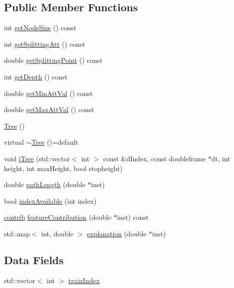 \subsection*{Public Member Functions}
\begin{DoxyCompactItemize}
\item 
int \hyperlink{classTree_a0ab54e1652274e304c25473759dcd0da}{get\+Node\+Size} () const
\item 
int \hyperlink{classTree_a877c320f9bed56b1f6d64fc04bd86b97}{get\+Splitting\+Att} () const
\item 
double \hyperlink{classTree_af06e12f440902448730cbe0a7d4fd9a6}{get\+Splitting\+Point} () const
\item 
int \hyperlink{classTree_ad9759be8d8887d04a29ebae7240ced85}{get\+Depth} () const
\item 
double \hyperlink{classTree_a3342558dd44c84ad29c19422f5af4e72}{get\+Min\+Att\+Val} () const
\item 
double \hyperlink{classTree_a70c0b9e6a3a982f6d7c0d38f81019bcf}{get\+Max\+Att\+Val} () const
\item 
\hyperlink{classTree_ad376a7c639d857312f5de2ef47482f68}{Tree} ()
\item 
virtual \hyperlink{classTree_aed209ec340bcf7a378d178e9b41efe44}{$\sim$\+Tree} ()=default
\item 
void \hyperlink{classTree_adf8961073e1d8d7c40c6cb6e6f41bc4c}{i\+Tree} (std\+::vector$<$ int $>$ const \&d\+Index, const doubleframe $\ast$dt, int height, int max\+Height, bool stopheight)
\item 
double \hyperlink{classTree_ad4fdb18020ffddf0250baeeaaaf4e3b5}{path\+Length} (double $\ast$inst)
\item 
bool \hyperlink{classTree_a55ec593d15665c30a9c060db4de09934}{index\+Available} (int index)
\item 
\hyperlink{Contribution_8hpp_a2616a8be768d8598bf3a607996f0f6a4}{contrib} \hyperlink{classTree_a9f3265f93db0eb30a42435d00e26365d}{feature\+Contribution} (double $\ast$inst) const
\item 
std\+::map$<$ int, double $>$ \hyperlink{classTree_a435fa1c641f2abe5e26d36507ba02555}{explanation} (double $\ast$inst)
\end{DoxyCompactItemize}
\subsection*{Data Fields}
\begin{DoxyCompactItemize}
\item 
std\+::vector$<$ int $>$ \hyperlink{classTree_a571ce830364b91f9467f5d464ca119e0}{train\+Index}
\end{DoxyCompactItemize}
